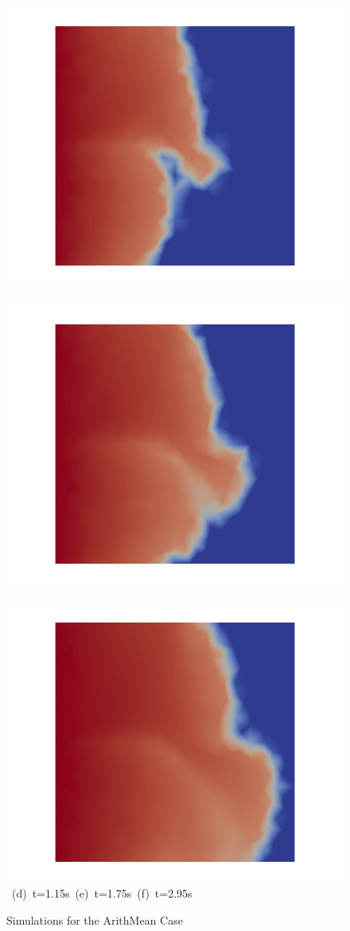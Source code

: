 \begin{landscape}
\begin{figure}[ht]
{\vspace{0.5cm}
\hbox{
      \includegraphics[width=.56\textwidth]{./Pics/ArithMeanCase/ArithMeanCase_Saturation_t_1dot15.png}
      \includegraphics[width=.56\textwidth]{./Pics/ArithMeanCase/ArithMeanCase_Saturation_t_1dot75.png} 
      \includegraphics[width=.56\textwidth]{./Pics/ArithMeanCase/ArithMeanCase_Saturation_t_2dot95.png}}
\vspace{0.cm}
\hbox{ \hspace{2.5cm} (d) t=1.15s \hspace{5.5cm} (e) t=1.75s   \hspace{5.5cm} (f) t=2.95s}
\vspace{0.cm}
}   
\caption{Simulations for the ArithMean Case}
\label{fig:ArithMeanCase_Saturation}
\end{figure}
\end{landscape}
\clearpage



